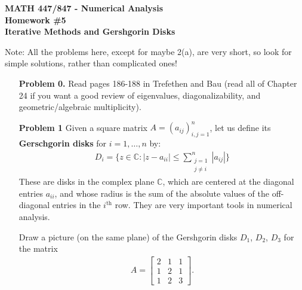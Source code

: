 \documentclass[12pt]{amsart}
\theoremstyle{plain}
\theoremstyle{definition}
\theoremstyle{remark}
\numberwithin{equation}{section} %
\numberwithin{figure}{section}   %
\newcommand{\field}[1]{\mathbb{#1}}
\newcommand{\nC}{\field{C}}
\begin{document}
\begin{center}
{\bf MATH 447/847 - Numerical Analysis\\
Homework \#5 \\
Iterative Methods and Gershgorin Disks}
\end{center}

\noindent
Note: All the problems here, except for maybe 2(a), are very short, so look for simple solutions, rather than complicated ones!

\bigskip


%  


\begin{itemize}
\item[\bf Problem 0.] Read pages 186-188  in Trefethen and Bau (read all of Chapter 24 if you want a good review of eigenvalues, diagonalizability, and geometric/algebraic multiplicity).

\bigskip

\item[\bf Problem 1] Given a square matrix $A=(a_{ij})_{i,j=1}^n$, let us define its  \textbf{Gerschgorin disks} for $i=1,\ldots,n$ by:
 \begin{align*}
  D_i = \Bigg\{z\in\nC : |z-a_{ii}|\leq \sum_{\substack{j=1\\j\neq i}}^n|a_{ij}|\Bigg\}
 \end{align*}
 These are disks in the complex plane $\nC$, which are centered at the diagonal entries $a_{ii}$, and whose radius is the sum of the absolute values of the off-diagonal entries in the $i^{\text{th}}$ row. They are very important tools in numerical analysis. 
 
 Draw a picture (on the same plane) of the Gershgorin disks $D_1$, $D_2$, $D_3$ for the matrix
 \begin{align*}
  A =  \begin{bmatrix}
  2 & 1&1\\1 & 2&1\\1 & 2&3
 \end{bmatrix}.
 \end{align*}
 
 \bigskip
 

\end{itemize}
\end{document}
